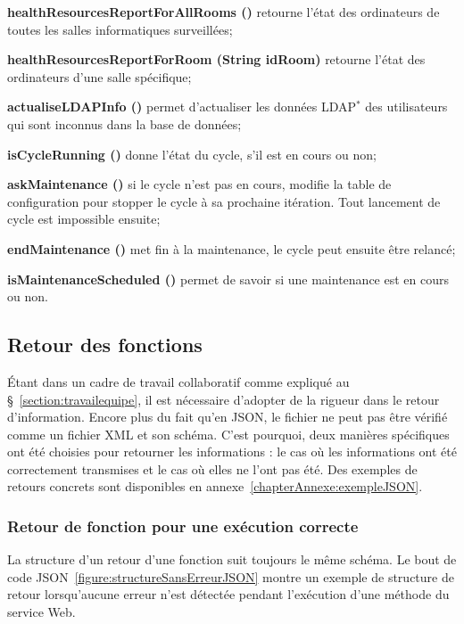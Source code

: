 \begin{longdescription}
	\item[\textbf{healthResourcesReportForAllRooms ()}] retourne l'\'etat des ordinateurs de toutes les salles informatiques surveill\'ees;
	\item[\textbf{healthResourcesReportForRoom (String idRoom)}] retourne l'\'etat des ordinateurs d'une salle sp\'ecifique;
	\item[\textbf{actualiseLDAPInfo ()}] permet d'actualiser les donn\'ees LDAP$^*$ des utilisateurs qui sont inconnus dans la base de donn\'ees;
	\item[\textbf{isCycleRunning ()}] donne l'\'etat du cycle, s'il est en cours ou non;
	\item[\textbf{askMaintenance ()}] si le cycle n'est pas en cours, modifie la table de configuration pour stopper le cycle \`a sa prochaine it\'eration.
Tout lancement de cycle est impossible ensuite;
	\item[\textbf{endMaintenance ()}] met fin \`a la maintenance, le cycle peut ensuite \^etre relanc\'e;
	\item[\textbf{isMaintenanceScheduled ()}] permet de savoir si une maintenance est en cours ou non.

\end{longdescription}

\subsection{Retour des fonctions}
\label{section:retourFonction}

\'Etant dans un cadre de travail collaboratif comme expliqu\'e au \S~\ref{section:travailequipe}, il est n\'ecessaire d'adopter de la rigueur dans le retour d'information.
Encore plus du fait qu'en JSON, le fichier ne peut pas \^etre v\'erifi\'e comme un fichier XML et son sch\'ema.
C'est pourquoi, deux mani\`eres sp\'ecifiques ont \'et\'e choisies pour retourner les informations : le cas o\`u les informations ont \'et\'e correctement transmises et le cas o\`u elles ne l'ont pas \'et\'e.
Des exemples de retours concrets sont disponibles en annexe~\ref{chapterAnnexe:exempleJSON}.

\subsubsection{Retour de fonction pour une ex\'ecution correcte}

La structure d'un retour d'une fonction suit toujours le m\^eme sch\'ema.
Le bout de code JSON~\ref{figure:structureSansErreurJSON} montre un exemple de structure de retour lorsqu'aucune erreur n'est d\'etect\'ee pendant l'ex\'ecution d'une m\'ethode du service Web.

